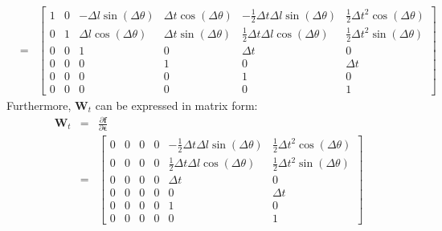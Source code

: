\documentclass[12pt, a4paper]{article}
\begin{document}
\begin{eqnarray*}
  & = & \begin{bmatrix}
  1 & 0 & -\Delta l\sin(\Delta\theta) & \Delta t\cos(\Delta\theta) & -\frac{1}{2}\Delta t\Delta l\sin(\Delta\theta) & \frac{1}{2}\Delta t^2\cos(\Delta\theta)\\
  0 & 1 & \Delta l\cos(\Delta\theta) & \Delta t\sin(\Delta\theta) & \frac{1}{2}\Delta t\Delta l\cos(\Delta\theta) & \frac{1}{2}\Delta t^2\sin(\Delta\theta)\\
  0 & 0 & 1 & 0 & \Delta t & 0\\
  0 & 0 & 0 & 1 & 0 & \Delta t\\
  0 & 0 & 0 & 0 & 1 & 0\\
  0 & 0 & 0 & 0 & 0 & 1
  \end{bmatrix}
\end{eqnarray*}
Furthermore, $\bm{W}_{t}$ can be expressed in matrix form:
\begin{eqnarray*}
  \bm{W}_{t} & = & \frac{\partial\bm{f}}{\partial\bm{\epsilon}}\\
  & = & \begin{bmatrix}
    0 & 0 & 0 & 0 & -\frac{1}{2}\Delta t\Delta l\sin(\Delta\theta) & \frac{1}{2}\Delta t^{2}\cos(\Delta\theta)\\
    0 & 0 & 0 & 0 & \frac{1}{2}\Delta t\Delta l\cos(\Delta\theta) & \frac{1}{2}\Delta t^{2}\sin(\Delta\theta)\\
    0 & 0 & 0 & 0 & \Delta t & 0\\
    0 & 0 & 0 & 0 & 0 & \Delta t\\
    0 & 0 & 0 & 0 & 1 & 0\\
    0 & 0 & 0 & 0 & 0 & 1
  \end{bmatrix}
\end{eqnarray*}
\end{document}
